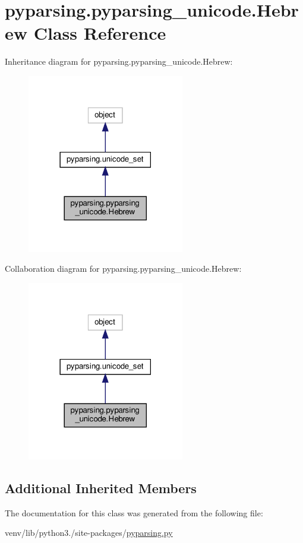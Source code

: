 \hypertarget{classpyparsing_1_1pyparsing__unicode_1_1Hebrew}{}\section{pyparsing.\+pyparsing\+\_\+unicode.\+Hebrew Class Reference}
\label{classpyparsing_1_1pyparsing__unicode_1_1Hebrew}


Inheritance diagram for pyparsing.\+pyparsing\+\_\+unicode.\+Hebrew\+:
\nopagebreak
\begin{figure}[H]
\begin{center}
\leavevmode
\includegraphics[width=194pt]{classpyparsing_1_1pyparsing__unicode_1_1Hebrew__inherit__graph}
\end{center}
\end{figure}


Collaboration diagram for pyparsing.\+pyparsing\+\_\+unicode.\+Hebrew\+:
\nopagebreak
\begin{figure}[H]
\begin{center}
\leavevmode
\includegraphics[width=194pt]{classpyparsing_1_1pyparsing__unicode_1_1Hebrew__coll__graph}
\end{center}
\end{figure}
\subsection*{Additional Inherited Members}


The documentation for this class was generated from the following file\+:\begin{DoxyCompactItemize}
\item 
venv/lib/python3./site-\/packages/\hyperlink{pyparsing_8py}{pyparsing.\+py}\end{DoxyCompactItemize}
